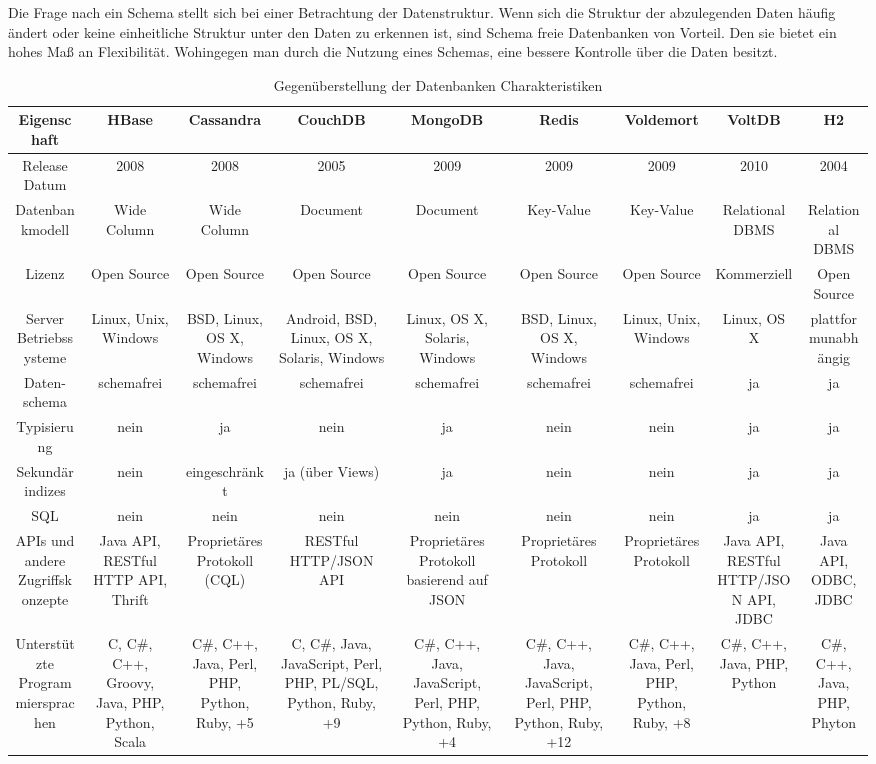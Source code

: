 Die Frage nach ein Schema stellt sich bei einer Betrachtung der Datenstruktur. Wenn sich die Struktur der abzulegenden Daten häufig ändert oder keine einheitliche Struktur unter den Daten zu erkennen ist, sind Schema freie Datenbanken von Vorteil. Den sie bietet ein hohes Maß an Flexibilität. Wohingegen man durch die Nutzung eines Schemas, eine bessere Kontrolle über die Daten besitzt.  


\begin{table}[H]
\tiny
\caption{Gegenüberstellung der Datenbanken Charakteristiken}
\label{tb_charakteristika}
\setlength{\tabcolsep}{1mm}
\begin{tabulary} {\linewidth} {C | C | C | C | C | C | C | C | C}
\toprule
Eigenschaft & HBase & Cassandra & CouchDB & MongoDB & Redis & Voldemort & VoltDB & H2 \\  
\midrule
Release Datum & 2008 & 2008 & 2005 & 2009 & 2009 & 2009 & 2010 & 2004 \\
\midrule
Datenbankmodell & Wide Column & Wide Column & Document & Document & Key-Value & Key-Value& Relational DBMS & Relational DBMS \\
\midrule
Lizenz & Open Source & Open Source & Open Source & Open Source & Open Source & Open Source & Kommerziell & Open Source \\
\midrule
Server Betriebssysteme & Linux, Unix, Windows & BSD, Linux, OS X, Windows & Android, BSD, Linux, OS X, Solaris, Windows & Linux, OS X, Solaris, Windows & BSD, Linux, OS X, Windows & Linux, Unix, Windows & Linux, OS X & plattformunabhängig \\
\midrule
Daten-schema & schemafrei & schemafrei & schemafrei & schemafrei & schemafrei & schemafrei & ja & ja \\
\midrule
Typisierung & nein & ja & nein & ja & nein & nein & ja & ja \\
\midrule
Sekundärindizes & nein & eingeschränkt & ja (über Views) & ja & nein & nein & ja & ja \\
\midrule
SQL & nein & nein & nein & nein & nein & nein & ja & ja \\
\midrule
APIs und andere Zugriffskonzepte & Java API, RESTful HTTP API, Thrift & Proprietäres Protokoll (CQL) & RESTful HTTP/JSON API & Proprietäres Protokoll basierend auf JSON & Proprietäres Protokoll & Proprietäres Protokoll & Java API, RESTful HTTP/JSON API, JDBC & Java API, ODBC, JDBC \\
\midrule
Unterstützte Programmiersprachen & C, C\#, C++, Groovy, Java, PHP, Python, Scala & C\#, C++, Java, Perl, PHP, Python, Ruby, +5 & C, C\#, Java, JavaScript, Perl, PHP, PL/SQL, Python, Ruby, +9 & C\#, C++, Java, JavaScript, Perl, PHP, Python, Ruby, +4 & C\#, C++, Java, JavaScript, Perl, PHP, Python, Ruby, +12 & C\#, C++, Java, Perl, PHP, Python, Ruby, +8 & C\#, C++, Java, PHP, Python & C\#, C++, Java, PHP, Phyton \\

\end{tabulary}
\end{table}
